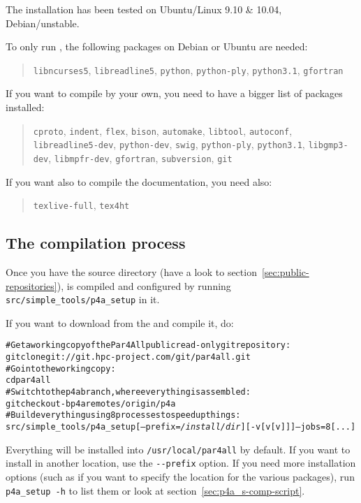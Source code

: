 \documentclass[a4paper]{article}
\begin{document}
The installation has been tested on Ubuntu/Linux 9.10 \& 10.04,
Debian/unstable.

To only run \Apfa, the following packages on Debian or Ubuntu are needed:
\begin{quote}
  \texttt{libncurses5}, \texttt{libreadline5}, \texttt{python},
  \texttt{python-ply}, \texttt{python3.1}, \texttt{gfortran}
\end{quote}

If you want to compile \Apfa by your own, you need to have a bigger list
of packages installed:
\begin{quote}
  \texttt{cproto}, \texttt{indent}, \texttt{flex}, \texttt{bison},
  \texttt{automake}, \texttt{libtool}, \texttt{autoconf},
  \texttt{libreadline5-dev}, \texttt{python-dev}, \texttt{swig},
  \texttt{python-ply}, \texttt{python3.1}, \texttt{libgmp3-dev},
  \texttt{libmpfr-dev}, \texttt{gfortran}, \texttt{subversion},
  \texttt{git}
\end{quote}

If you want also to compile the documentation, you need also:
\begin{quote}
  \texttt{texlive-full}, \texttt{tex4ht}
\end{quote}


\subsection{The compilation process}
\label{sec:compilation-process}

Once you have the \Apfa source directory (have a look to
section~\ref{sec:public-repositories}), \Apfa is compiled and configured
by running \verb|src/simple_tools/p4a_setup| in it.

If you want to download \Apfa from the \Agit and compile it, do:
\begin{alltt}
# Get a working copy of the Par4All public read-only git repository:
git clone git://git.hpc-project.com/git/par4all.git
# Go into the working copy:
cd par4all
# Switch to the p4a branch, where everything is assembled:
git checkout -b p4a remotes/origin/p4a
# Build everything using 8 processes to speed up things:
src/simple_tools/p4a_setup [--prefix=\emph{/install/dir}] [-v[v[v]]] --jobs=8 [...]
\end{alltt}%
Everything will be installed into \verb|/usr/local/par4all| by default.
If you want to install in another location, use the \verb|--prefix|
option.  If you need more installation options (such as if you want to
specify the location for the various packages), run \verb|p4a_setup -h| to
list them or look at section~\ref{sec:p4a_s-comp-script}.
\end{document}
